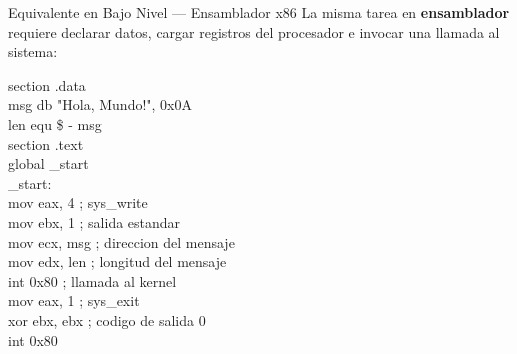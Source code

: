 \documentclass[10pt, aspectratio=169]{beamer}
\newcommand{\codigobox}[1]{
	\begin{block}{}
		\colorbox{codigofondo}{
			\begin{minipage}{0.96\textwidth}
				\ttfamily\scriptsize
				#1
			\end{minipage}
		}
	\end{block}
}
\begin{document}
	\begin{frame}{Equivalente en Bajo Nivel --- Ensamblador x86}
		La misma tarea en \textbf{ensamblador} requiere declarar datos, cargar registros
		del procesador e invocar una llamada al sistema:
		
		\vspace{0.2cm}
		
		\codigobox{
			section .data\\
			\hspace*{0.4cm}msg db "Hola, Mundo!", 0x0A\\
			\hspace*{0.4cm}len equ \$ - msg\\[0.15cm]
			section .text\\
			\hspace*{0.4cm}global \_start\\[0.15cm]
			\_start:\\
			\hspace*{0.4cm}mov eax, 4 \hspace*{0.7cm}; sys\_write\\
			\hspace*{0.4cm}mov ebx, 1 \hspace*{0.7cm}; salida estandar\\
			\hspace*{0.4cm}mov ecx, msg \hspace*{0.35cm}; direccion del mensaje\\
			\hspace*{0.4cm}mov edx, len \hspace*{0.45cm}; longitud del mensaje\\
			\hspace*{0.4cm}int 0x80 \hspace*{0.85cm}; llamada al kernel\\[0.15cm]
			\hspace*{0.4cm}mov eax, 1 \hspace*{0.7cm}; sys\_exit\\
			\hspace*{0.4cm}xor ebx, ebx \hspace*{0.35cm}; codigo de salida 0\\
			\hspace*{0.4cm}int 0x80
		}
		
	\end{frame}
	
\end{document}
